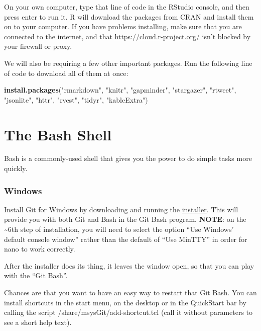 \documentclass[]{book}
\newenvironment{Shaded}{\begin{snugshade}}{\end{snugshade}}
\newcommand{\KeywordTok}[1]{\textcolor[rgb]{0.13,0.29,0.53}{\textbf{#1}}}
\newcommand{\StringTok}[1]{\textcolor[rgb]{0.31,0.60,0.02}{#1}}
\newcommand{\NormalTok}[1]{#1}
\begin{document}
On your own computer, type that line of code in the RStudio console, and
then press enter to run it. R will download the packages from CRAN and
install them on to your computer. If you have problems installing, make
sure that you are connected to the internet, and that
\url{https://cloud.r-project.org/} isn't blocked by your firewall or
proxy.

We will also be requiring a few other important packages. Run the
following line of code to download all of them at once:

\begin{Shaded}
\begin{Highlighting}[]
\KeywordTok{install.packages}\NormalTok{(}\StringTok{"rmarkdown"}\NormalTok{, }\StringTok{"knitr"}\NormalTok{, }\StringTok{"gapminder"}\NormalTok{, }\StringTok{"stargazer"}\NormalTok{, }\StringTok{"rtweet"}\NormalTok{, }\StringTok{"jsonlite"}\NormalTok{, }\StringTok{"httr"}\NormalTok{, }\StringTok{"rvest"}\NormalTok{, }\StringTok{"tidyr"}\NormalTok{, }\StringTok{"kableExtra"}\NormalTok{)}
\end{Highlighting}
\end{Shaded}

\section{The Bash Shell}\label{the-bash-shell}

Bash is a commonly-used shell that gives you the power to do simple
tasks more quickly.

\subsubsection*{Windows}\label{windows}

Install Git for Windows by downloading and running the
\href{http://msysgit.github.io/}{installer}. This will provide you with
both Git and Bash in the Git Bash program. \textbf{NOTE}: on the
\textasciitilde{}6th step of installation, you will need to select the
option ``Use Windows' default console window'' rather than the default
of ``Use MinTTY'' in order for nano to work correctly.

After the installer does its thing, it leaves the window open, so that
you can play with the ``Git Bash''.

Chances are that you want to have an easy way to restart that Git Bash.
You can install shortcuts in the start menu, on the desktop or in the
QuickStart bar by calling the script /share/msysGit/add-shortcut.tcl
(call it without parameters to see a short help text).
\end{document}
